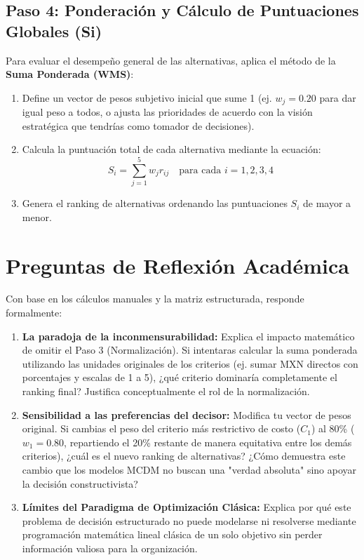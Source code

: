 \documentclass[11pt,a4paper]{article}
\begin{document}
\subsection{Paso 4: Ponderación y Cálculo de Puntuaciones Globales (Si)}
Para evaluar el desempeño general de las alternativas, aplica el método de la \textbf{Suma Ponderada (WMS)}:
\begin{enumerate}
  \item Define un vector de pesos subjetivo inicial que sume 1 (ej. $w_j = 0.20$ para dar igual peso a todos, o ajusta las prioridades de acuerdo con la visión estratégica que tendrías como tomador de decisiones).
  \item Calcula la puntuación total de cada alternativa mediante la ecuación:
    \begin{equation}
      S_i = \sum_{j=1}^5 w_j r_{ij} \quad \text{para cada } i = 1, 2, 3, 4
    \end{equation}
  \item Genera el ranking de alternativas ordenando las puntuaciones $S_i$ de mayor a menor.
\end{enumerate}

\section{Preguntas de Reflexión Académica}
Con base en los cálculos manuales y la matriz estructurada, responde formalmente:

\begin{enumerate}
  \item \textbf{La paradoja de la inconmensurabilidad:} Explica el impacto matemático de omitir el Paso 3 (Normalización). Si intentaras calcular la suma ponderada utilizando las unidades originales de los criterios (ej. sumar MXN directos con porcentajes y escalas de 1 a 5), ¿qué criterio dominaría completamente el ranking final? Justifica conceptualmente el rol de la normalización.
  \item \textbf{Sensibilidad a las preferencias del decisor:} Modifica tu vector de pesos original. Si cambias el peso del criterio más restrictivo de costo ($C_1$) al 80\% ($w_1 = 0.80$, repartiendo el 20\% restante de manera equitativa entre los demás criterios), ¿cuál es el nuevo ranking de alternativas? ¿Cómo demuestra este cambio que los modelos MCDM no buscan una "verdad absoluta" sino apoyar la decisión constructivista?
  \item \textbf{Límites del Paradigma de Optimización Clásica:} Explica por qué este problema de decisión estructurado no puede modelarse ni resolverse mediante programación matemática lineal clásica de un solo objetivo sin perder información valiosa para la organización.
\end{enumerate}
\end{document}
